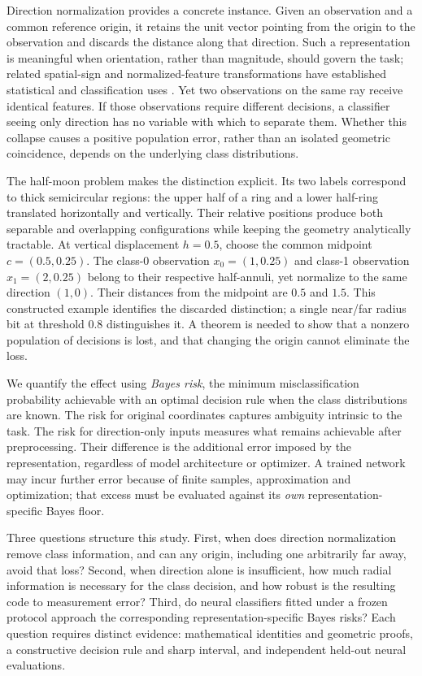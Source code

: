 \documentclass[12pt,a4paper]{article}
\begin{document}
Direction normalization provides a concrete instance. Given an observation and a common reference origin, it retains the unit vector pointing from the origin to the observation and discards the distance along that direction. Such a representation is meaningful when orientation, rather than magnitude, should govern the task; related spatial-sign and normalized-feature transformations have established statistical and classification uses \citep{Serneels2006,Graf2003}. Yet two observations on the same ray receive identical features. If those observations require different decisions, a classifier seeing only direction has no variable with which to separate them. Whether this collapse causes a positive population error, rather than an isolated geometric coincidence, depends on the underlying class distributions.

The half-moon problem makes the distinction explicit. Its two labels correspond to thick semicircular regions: the upper half of a ring and a lower half-ring translated horizontally and vertically. Their relative positions produce both separable and overlapping configurations while keeping the geometry analytically tractable. At vertical displacement \(h=0.5\), choose the common midpoint \(c=(0.5,0.25)\). The class-0 observation \(x_0=(1,0.25)\) and class-1 observation \(x_1=(2,0.25)\) belong to their respective half-annuli, yet normalize to the same direction \((1,0)\). Their distances from the midpoint are \(0.5\) and \(1.5\). This constructed example identifies the discarded distinction; a single near/far radius bit at threshold \(0.8\) distinguishes it. A theorem is needed to show that a nonzero population of decisions is lost, and that changing the origin cannot eliminate the loss.

We quantify the effect using \emph{Bayes risk}, the minimum misclassification probability achievable with an optimal decision rule when the class distributions are known. The risk for original coordinates captures ambiguity intrinsic to the task. The risk for direction-only inputs measures what remains achievable after preprocessing. Their difference is the additional error imposed by the representation, regardless of model architecture or optimizer. A trained network may incur further error because of finite samples, approximation and optimization; that excess must be evaluated against its \emph{own} representation-specific Bayes floor.

Three questions structure this study. First, when does direction normalization remove class information, and can any origin, including one arbitrarily far away, avoid that loss? Second, when direction alone is insufficient, how much radial information is necessary for the class decision, and how robust is the resulting code to measurement error? Third, do neural classifiers fitted under a frozen protocol approach the corresponding representation-specific Bayes risks? Each question requires distinct evidence: mathematical identities and geometric proofs, a constructive decision rule and sharp interval, and independent held-out neural evaluations.
\end{document}
